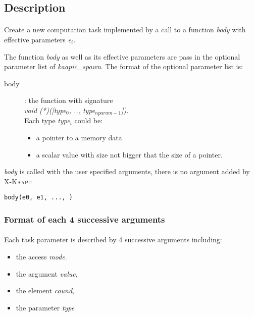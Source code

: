\documentclass[a4paper, 11pt]{article}
\newcommand{\kaapi}{\textsc{X-Kaapi}\xspace}
\begin{document}
\subsection{Description}
\paragraph{}
Create a new computation task implemented by a call to a function \textit{body} with effective parameters \textit{e$_i$}.

The function \textit{body} as well as its effective parameters are pass in the optional parameter list of \textit{kaapic\_spawn}.
The format of the optional parameter list is:
\begin{description}
\item [body]: the function with signature\\
\hspace*{5ex}\textit{void (*)([type$_0$, .., type$_{nparam-1}$])}.\\
Each type \textit{type$_i$} could be:
\begin{itemize}
\item a pointer to a memory data
\item a scalar value with size not bigger that the size of a pointer.
\end{itemize}
\end{description}

\textit{body} is called with the user specified arguments, there is no argument added by \kaapi:\\
\begin{small}
\lstset{language=C}
\begin{lstlisting}[frame=tb]
body(e0, e1, ..., )
\end{lstlisting}
\end{small}

\subsubsection{Format of each 4 successive arguments}
\paragraph{}
Each task parameter is described by 4 successive arguments including:
\begin{itemize}
\item the access \textit{mode}.
\item the argument \textit{value},
\item the element \textit{cound},
\item the parameter \textit{type}
\end{itemize}
\end{document}
